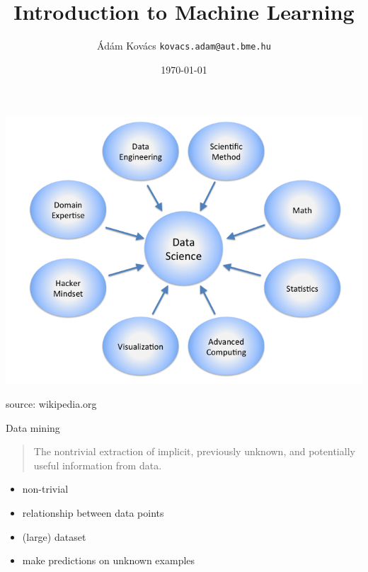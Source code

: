 \documentclass[bigger]{beamer}
\title{Introduction to Machine Learning}
\date[]{\today}
\author[Ádám Kovács]{Ádám Kovács \texttt{kovacs.adam@aut.bme.hu}}
\begin{document}
\begin{frame}
\titlepage
\end{frame}

\begin{frame}
    \begin{center}
\includegraphics[width=.8\textwidth]{fig/data_science}
    \end{center}
    \footnotesize{source: wikipedia.org}
\end{frame}

\begin{frame}{Data mining}
    \begin{quote}
        The nontrivial extraction of implicit, previously
    unknown, and potentially useful information
    from data.
    \end{quote}
    \begin{itemize}
        \item non-trivial
        \item relationship between data points
        \item (large) dataset
        \item make predictions on unknown examples
    \end{itemize}
\end{frame}
\end{document}
